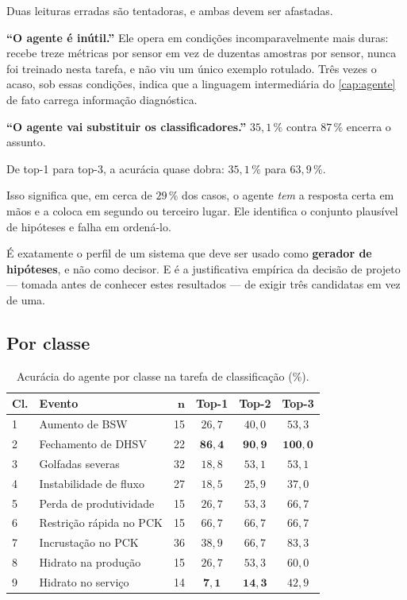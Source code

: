 Duas leituras erradas são tentadoras, e ambas devem ser afastadas.

\textbf{``O agente é inútil.''} Ele opera em condições incomparavelmente mais duras:
recebe treze métricas por sensor em vez de duzentas amostras por sensor, nunca foi
treinado nesta tarefa, e não viu um único exemplo rotulado. Três vezes o acaso, sob essas
condições, indica que a linguagem intermediária do \cref{cap:agente} de fato carrega
informação diagnóstica.

\textbf{``O agente vai substituir os classificadores.''} $35{,}1\,\%$ contra $87\,\%$
encerra o assunto.

\begin{destaque}
De top-1 para top-3, a acurácia quase dobra: $35{,}1\,\%$ para $63{,}9\,\%$.

Isso significa que, em cerca de $29\,\%$ dos casos, o agente \emph{tem} a resposta certa
em mãos e a coloca em segundo ou terceiro lugar. Ele identifica o conjunto plausível de
hipóteses e falha em ordená-lo.

É exatamente o perfil de um sistema que deve ser usado como \textbf{gerador de
hipóteses}, e não como decisor. E é a justificativa empírica da decisão de projeto ---
tomada antes de conhecer estes resultados --- de exigir três candidatas em vez de uma.
\end{destaque}

\subsection{Por classe}

\begin{table}[htbp]
\centering
\caption{Acurácia do agente por classe na tarefa de classificação (\%).}
\label{tab:ag-porclasse}
\small
\begin{tabular}{llrccc}
\toprule
\textbf{Cl.} & \textbf{Evento} & $\bm{n}$ & \textbf{Top-1} & \textbf{Top-2} & \textbf{Top-3} \\
\midrule
1 & Aumento de BSW            & 15 & $26{,}7$ & $40{,}0$ & $53{,}3$ \\
2 & Fechamento de DHSV        & 22 & $\bm{86{,}4}$ & $\bm{90{,}9}$ & $\bm{100{,}0}$ \\
3 & Golfadas severas          & 32 & $18{,}8$ & $53{,}1$ & $53{,}1$ \\
4 & Instabilidade de fluxo    & 27 & $18{,}5$ & $25{,}9$ & $37{,}0$ \\
5 & Perda de produtividade    & 15 & $26{,}7$ & $53{,}3$ & $66{,}7$ \\
6 & Restrição rápida no PCK   & 15 & $66{,}7$ & $66{,}7$ & $66{,}7$ \\
7 & Incrustação no PCK        & 36 & $38{,}9$ & $66{,}7$ & $83{,}3$ \\
8 & Hidrato na produção       & 15 & $26{,}7$ & $53{,}3$ & $60{,}0$ \\
9 & Hidrato no serviço        & 14 & $\bm{7{,}1}$ & $\bm{14{,}3}$ & $42{,}9$ \\
\bottomrule
\end{tabular}
\end{table}

